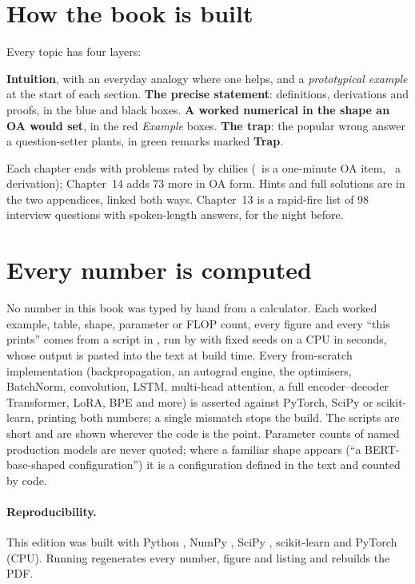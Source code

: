 \section*{How the book is built}
Every topic has four layers:
\begin{enumerate}
	\ii \textbf{Intuition}, with an everyday analogy where one helps, and a \emph{prototypical example}
	at the start of each section.
	\ii \textbf{The precise statement}: definitions, derivations and proofs, in the blue and black boxes.
	\ii \textbf{A worked numerical in the shape an OA would set}, in the red \emph{Example} boxes.
	\ii \textbf{The trap}: the popular wrong answer a question-setter plants, in green remarks marked
	\textbf{\color{red!70!black}\sffamily Trap}.
\end{enumerate}
Each chapter ends with problems rated by chilies (\chili\ is a one-minute OA item,
\chili\chili\chili\ a derivation); Chapter~14 adds 73 more in OA form. Hints and full solutions are in the
two appendices, linked both ways. Chapter~13 is a rapid-fire list of 98 interview questions with
spoken-length answers, for the night before.

\section*{Every number is computed}
No number in this book was typed by hand from a calculator. Each worked example, table, shape,
parameter or FLOP count, every figure and every ``this prints'' comes from a script in
, run by  with fixed seeds on a CPU in seconds, whose output is pasted
into the text at build time. Every from-scratch implementation (backpropagation, an autograd engine,
the optimisers, BatchNorm, convolution, LSTM, multi-head attention, a full encoder--decoder
Transformer, LoRA, BPE and more) is asserted against PyTorch, SciPy or scikit-learn, printing both
numbers; a single mismatch stops the build. The scripts are short and are shown wherever the code is
the point. Parameter counts of named production models are never quoted; where a familiar shape
appears (``a BERT-base-shaped configuration'') it is a configuration defined in the text and counted
by code.

\paragraph{Reproducibility.} This edition was built with Python , NumPy
, SciPy , scikit-learn  and
PyTorch  (CPU). Running  regenerates every number, figure
and listing and rebuilds the PDF.

